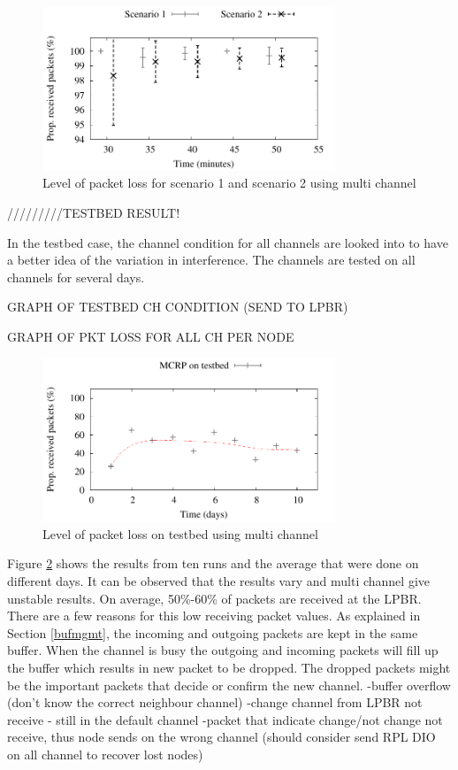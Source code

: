 \begin{figure}
\centering
\includegraphics[width=0.78\textwidth]{multi_channel.pdf}
\caption{Level of packet loss for scenario 1 and scenario 2 using multi channel}
\label{fig:multi_interference}
\end{figure}

/////////TESTBED RESULT!

In the testbed case, the channel condition for all channels are looked into to have a better idea of the variation in interference. The channels are tested on all channels for several days.

GRAPH OF TESTBED CH CONDITION (SEND TO LPBR) 

GRAPH OF PKT LOSS FOR ALL CH PER NODE


\begin{figure}
\centering
\includegraphics[width=0.78\textwidth]{experiments/mct.pdf}
\caption{Level of packet loss on testbed using multi channel}
\label{fig:mcrp_testbed}
\end{figure}

Figure \ref{fig:mcrp_testbed} shows the results from ten runs and the average that were done on different days. It can be observed that the results vary and multi channel give unstable results. On average, 50\%-60\% of packets are received at the LPBR. There are a few reasons for this low receiving packet values. As explained in Section \ref{bufmgmt}, the incoming and outgoing packets are kept in the same buffer. When the channel is busy the outgoing and incoming packets will fill up the buffer which results in new packet to be dropped. The dropped packets might be the important packets that decide or confirm the new channel. 
-buffer overflow (don't know the correct neighbour channel)
-change channel from LPBR not receive - still in the default channel
-packet that indicate change/not change not receive, thus node sends on the wrong channel (should consider send RPL DIO on all channel to recover lost nodes)

